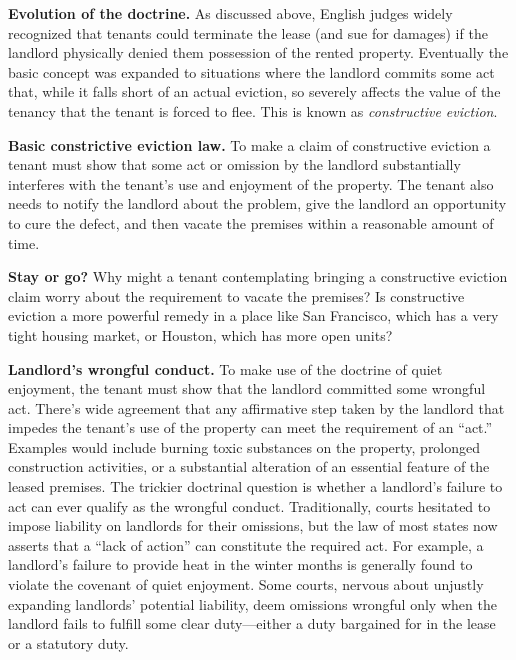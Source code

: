 
\item \textbf{Evolution of the doctrine.}  As discussed above, English judges
widely recognized that tenants could terminate the lease (and sue for damages)
if the landlord physically denied them possession of the rented property. 
Eventually the basic concept was expanded to situations where the landlord
commits some act that, while it falls short of an actual eviction, so severely
affects the value of the tenancy that the tenant is forced to flee.  This is
known as \textit{constructive eviction}.  


\item \textbf{Basic constrictive eviction law.} To make a claim of constructive
eviction a tenant must show that some act or omission by the landlord
substantially interferes with the tenant's use and enjoyment of the property. 
The tenant also needs to notify the landlord about the problem, give the
landlord an opportunity to cure the defect, and then vacate the premises within
a reasonable amount of time.


\item \textbf{Stay or go?} Why might a tenant contemplating bringing a
constructive eviction claim worry about the requirement to vacate the premises?
 Is constructive eviction a more powerful remedy in a place like San Francisco,
which has a very tight housing market, or Houston, which has more open units?  


\item \textbf{Landlord's wrongful conduct.}  To make use of the doctrine of
quiet enjoyment, the tenant must show that the landlord committed some wrongful
act.  There's wide agreement that any affirmative step taken by the landlord
that impedes the tenant's use of the property can meet the requirement of an
``act.''  Examples would include burning toxic substances on the property,
prolonged construction activities, or a substantial alteration of an essential
feature of the leased premises.  The trickier doctrinal question is whether a
landlord's failure to act can ever qualify as the wrongful conduct. 
Traditionally, courts hesitated to impose liability on landlords for their
omissions, but the law of most states now asserts that a ``lack of action'' can
constitute the required act. For example, a landlord's failure to provide heat
in the winter months is generally found to violate the covenant of quiet
enjoyment. Some courts, nervous about unjustly expanding landlords' potential
liability, deem omissions wrongful only when the landlord fails to fulfill some
clear duty---either a duty bargained for in the lease or a statutory duty.


